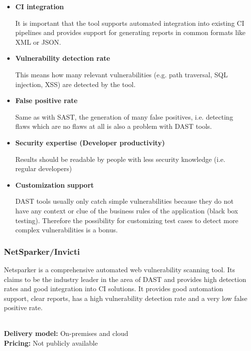 \documentclass[conference]{IEEEtran}
\begin{document}
\begin{itemize}
	\item \textbf{CI integration}

	It is important that the tool supports automated integration into existing CI pipelines and provides support for generating reports in common formats like XML or JSON.
	
	\item \textbf{Vulnerability detection rate}
	
	This means how many relevant vulnerabilities (e.g. path traversal, SQL injection, XSS) are detected by the tool.
	
	\item \textbf{False positive rate}
	
	Same as with SAST, the generation of many false positives, i.e. detecting flaws which are no flaws at all is also a problem with DAST tools.

	\item \textbf{Security expertise (Developer productivity)}

	Results should be readable by people with less security knowledge (i.e. regular developers)

	\item \textbf{Customization support}

	DAST tools usually only catch simple vulnerabilities because they do not have any context or clue of the business rules of the application (black box testing). Therefore the possibility for customizing test cases to detect more complex vulnerabilities is a bonus.\\
\end{itemize}

\noindent
\subsubsection{NetSparker/Invicti \cite{dast1}}

Netsparker is a comprehensive automated web vulnerability scanning tool. Its claims to be the industry leader in the area of DAST and provides high detection rates and good integration into CI solutions. It provides good automation support, clear reports, has a high vulnerability detection rate and a very low false positive rate.

\noindent\\
\textbf{Delivery model:} On-premises and cloud
\noindent\\
\textbf{Pricing:} Not publicly available
\\
\end{document}
